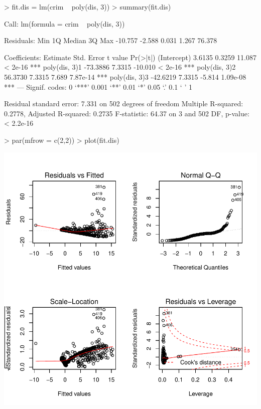 \documentclass[a4paper]{article}
\begin{document}
\begin{Schunk}
\begin{Sinput}
> fit.dis = lm(crim ~ poly(dis, 3))
> summary(fit.dis)
\end{Sinput}
\begin{Soutput}
Call:
lm(formula = crim ~ poly(dis, 3))

Residuals:
    Min      1Q  Median      3Q     Max 
-10.757  -2.588   0.031   1.267  76.378 

Coefficients:
              Estimate Std. Error t value Pr(>|t|)    
(Intercept)     3.6135     0.3259  11.087  < 2e-16 ***
poly(dis, 3)1 -73.3886     7.3315 -10.010  < 2e-16 ***
poly(dis, 3)2  56.3730     7.3315   7.689 7.87e-14 ***
poly(dis, 3)3 -42.6219     7.3315  -5.814 1.09e-08 ***
---
Signif. codes:  0 ‘***’ 0.001 ‘**’ 0.01 ‘*’ 0.05 ‘.’ 0.1 ‘ ’ 1

Residual standard error: 7.331 on 502 degrees of freedom
Multiple R-squared:  0.2778,	Adjusted R-squared:  0.2735 
F-statistic: 64.37 on 3 and 502 DF,  p-value: < 2.2e-16
\end{Soutput}
\begin{Sinput}
> par(mfrow = c(2,2))
> plot(fit.dis)
\end{Sinput}
\end{Schunk}
\includegraphics{mutivariblelm-dis2}
\end{document}
